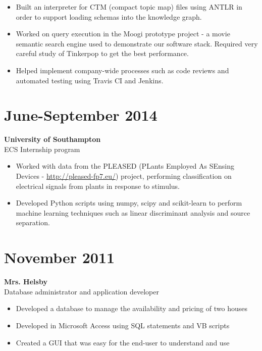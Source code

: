 \documentclass[margin]{res}
\begin{document}
\begin{resume}
\begin{itemize}
\item
Built an interpreter for CTM (compact topic map) files using ANTLR in order to support loading schemas into the knowledge graph.

\item
Worked on query execution in the Moogi prototype project - a movie semantic search engine used to demonstrate our software stack. Required very careful study of Tinkerpop to get the best performance.

\item
Helped implement company-wide processes such as code reviews and automated testing using Travis CI and Jenkins.

\end{itemize}

\normalsize{\section{June-September 2014}}
{\bf University of Southampton} \\
ECS Internship program \\
\begin{itemize}
\item
Worked with data from the PLEASED
(PLants Employed As SEnsing Devices - \href{http://pleased-fp7.eu/}{http://pleased-fp7.eu/}) project, performing classification on electrical signals from plants in response to stimulus.
\item
Developed Python scripts using numpy, scipy and scikit-learn to perform machine learning techniques such as linear discriminant analysis and source separation.
\end{itemize}

\normalsize{\section{November 2011}}
{\bf Mrs. Helsby} \\
Database administrator and application developer \\
\begin{itemize}
\item Developed a database to manage the availability and pricing of two houses
\item Developed in Microsoft Access using SQL statements and VB scripts
\item Created a GUI that was easy for the end-user to understand and use
\end{itemize}


\end{resume}
\end{document}
